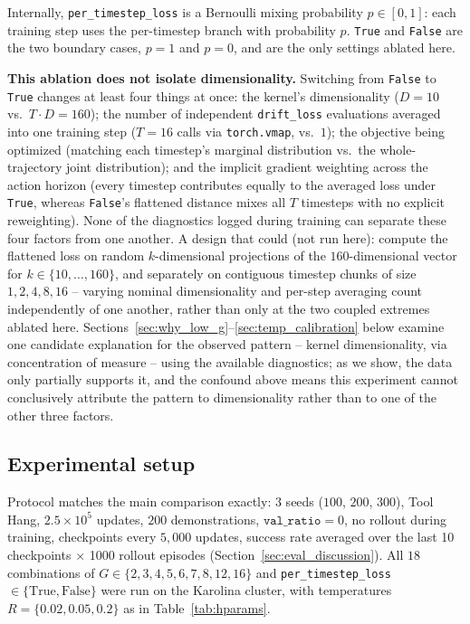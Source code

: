 \documentclass[11pt]{article}
\begin{document}
Internally, \texttt{per\_timestep\_loss} is a Bernoulli mixing probability
$p\in[0,1]$: each training step uses the per-timestep branch with
probability $p$. \texttt{True} and \texttt{False} are the two boundary
cases, $p=1$ and $p=0$, and are the only settings ablated here.

\textbf{This ablation does not isolate dimensionality.} Switching from
\texttt{False} to \texttt{True} changes at least four things at once:
the kernel's dimensionality ($D=10$ vs.\ $T{\cdot}D=160$); the number of
independent \texttt{drift\_loss} evaluations averaged into one training
step ($T=16$ calls via \texttt{torch.vmap}, vs.\ $1$); the objective being
optimized (matching each timestep's marginal distribution vs.\ the
whole-trajectory joint distribution); and the implicit gradient weighting
across the action horizon (every timestep contributes equally to the
averaged loss under \texttt{True}, whereas \texttt{False}'s flattened
distance mixes all $T$ timesteps with no explicit reweighting). None of
the diagnostics logged during training can separate these four factors
from one another. A design that could (not run here): compute the
flattened loss on random $k$-dimensional projections of the
$160$-dimensional vector for $k\in\{10,\ldots,160\}$, and separately on
contiguous timestep chunks of size $1,2,4,8,16$ -- varying nominal
dimensionality and per-step averaging count independently of one another,
rather than only at the two coupled extremes ablated here. Sections~\ref{sec:why_low_g}--\ref{sec:temp_calibration}
below examine one candidate explanation for the observed pattern --
kernel dimensionality, via concentration of measure -- using the
available diagnostics; as we show, the data only partially supports it,
and the confound above means this experiment cannot conclusively
attribute the pattern to dimensionality rather than to one of the other
three factors.

\subsection{Experimental setup}

Protocol matches the main comparison exactly: 3 seeds ($100$, $200$,
$300$), Tool Hang, $2.5\times10^5$ updates, $200$ demonstrations,
$\texttt{val\_ratio}=0$, no rollout during training, checkpoints every
$5{,}000$ updates, success rate averaged over the last 10 checkpoints
$\times$ 1000 rollout episodes (Section~\ref{sec:eval_discussion}). All
$18$ combinations of $G\in\{2,3,4,5,6,7,8,12,16\}$ and
\texttt{per\_timestep\_loss}$\in\{\text{True},\text{False}\}$ were run on
the Karolina cluster, with temperatures $R=\{0.02,0.05,0.2\}$ as in
Table~\ref{tab:hparams}.
\end{document}
